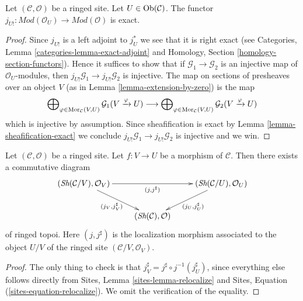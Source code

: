 \begin{lemma}
\label{lemma-extension-by-zero-exact}
Let $(\mathcal{C}, \mathcal{O})$ be a ringed site.
Let $U \in \mathop{\rm Ob}\nolimits(\mathcal{C})$.
The functor
$j_{U!} : \textit{Mod}(\mathcal{O}_U) \to \textit{Mod}(\mathcal{O})$
is exact.
\end{lemma}

\begin{proof}
Since $j_{U!}$ is a left adjoint to $j_U^*$ we see that it is right exact
(see
Categories, Lemma \ref{categories-lemma-exact-adjoint}
and
Homology, Section \ref{homology-section-functors}).
Hence it suffices to show that if $\mathcal{G}_1 \to \mathcal{G}_2$
is an injective map of $\mathcal{O}_U$-modules, then
$j_{U!}\mathcal{G}_1 \to j_{U!}\mathcal{G}_2$ is injective.
The map on sections of presheaves over an object $V$
(as in Lemma \ref{lemma-extension-by-zero}) is the map
$$
\bigoplus\nolimits_{\varphi \in \mathop{\rm Mor}\nolimits_\mathcal{C}(V, U)}
\mathcal{G}_1(V \xrightarrow{\varphi} U)
\longrightarrow
\bigoplus\nolimits_{\varphi \in \mathop{\rm Mor}\nolimits_\mathcal{C}(V, U)}
\mathcal{G}_2(V \xrightarrow{\varphi} U)
$$
which is injective by assumption. Since sheafification is exact by
Lemma \ref{lemma-sheafification-exact}
we conclude $j_{U!}\mathcal{G}_1 \to j_{U!}\mathcal{G}_2$ is injective and
we win.
\end{proof}

\begin{lemma}
\label{lemma-relocalize}
Let $(\mathcal{C}, \mathcal{O})$ be a ringed site.
Let $f : V \to U$ be a morphism of $\mathcal{C}$.
Then there exists a commutative diagram
$$
\xymatrix{
(\Sh(\mathcal{C}/V), \mathcal{O}_V)
\ar[rd]_{(j_V, j_V^\sharp)} \ar[rr]_{(j, j^\sharp)} & &
(\Sh(\mathcal{C}/U), \mathcal{O}_U)
\ar[ld]^{(j_U, j_U^\sharp)} \\
& (\Sh(\mathcal{C}), \mathcal{O}) &
}
$$
of ringed topoi. Here $(j, j^\sharp)$ is the localization morphism
associated to the object $U/V$ of the ringed site
$(\mathcal{C}/V, \mathcal{O}_V)$.
\end{lemma}

\begin{proof}
The only thing to check is that
$j_V^\sharp = j^\sharp \circ j^{-1}(j_U^\sharp)$,
since everything else follows directly from
Sites, Lemma \ref{sites-lemma-relocalize} and
Sites, Equation (\ref{sites-equation-relocalize}).
We omit the verification of the equality.
\end{proof}

